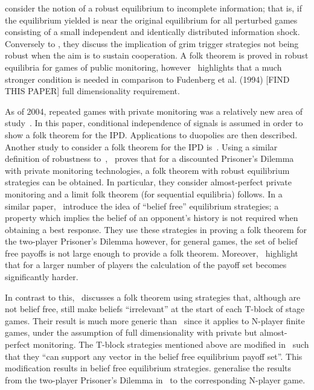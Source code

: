 \cite{Chassang2011} consider the notion of a robust equilibrium to incomplete
information; that is, if the equilibrium yielded is near the original
equilibrium for all perturbed games consisting of a small independent and
identically distributed information shock. Conversely to \cite{Friedman1971},
they discuss the implication of grim trigger strategies not being robust when
the aim is to sustain cooperation. A folk theorem is proved in robust equilibria
for games of public monitoring, however~\cite{Chassang2011} highlights that a
much stronger condition is needed in comparison to Fudenberg et al. (1994) [FIND
THIS PAPER] full
dimensionality requirement.

As of 2004, repeated games with private monitoring was a relatively new area of
study~\cite{Matsushima2004}. In this paper, conditional independence of signals
is assumed in order to show a folk theorem for the IPD\@. Applications to
duopolies are then described. Another study to consider a folk theorem for the
IPD is~\cite{Ely2002}. Using a similar definition of robustness
to~\cite{Chassang2011},~\cite{Ely2002} proves that for a discounted Prisoner's
Dilemma with private monitoring technologies, a folk theorem with robust
equilibrium strategies can be obtained. In particular, they consider
almost-perfect private monitoring and a limit folk theorem (for sequential
equilibria) follows. In a similar paper,~\cite{Ely2005} introduce the idea of
``belief free'' equilibrium strategies; a property which implies the belief of
an opponent's history is not required when obtaining a best response. They use
these strategies in proving a folk theorem for the two-player Prisoner's Dilemma
however, for general games, the set of belief free payoffs is not large enough
to provide a folk theorem. Moreover,~\cite{Ely2005} highlight that for a larger
number of players the calculation of the payoff set becomes significantly
harder.

In contrast to this,~\cite{Hoerner2006} discusses a folk theorem using strategies
that, although are not belief free, still make beliefs ``irrelevant'' at the
start of each T-block of stage games. Their result is much more generic
than~\cite{Ely2005} since it applies to N-player finite games, under the
assumption of full dimensionality with private but almost-perfect monitoring.
The T-block strategies mentioned above are modified in~\cite{Yamamoto2009,
Yamamoto2012} such that they ``can support any vector in the belief free
equilibrium payoff set''. This modification results in belief free equilibrium
strategies. \cite{Yamamoto2009, Yamamoto2012} generalise the results from the
two-player Prisoner's Dilemma in~\cite{Ely2005} to the corresponding N-player game.


